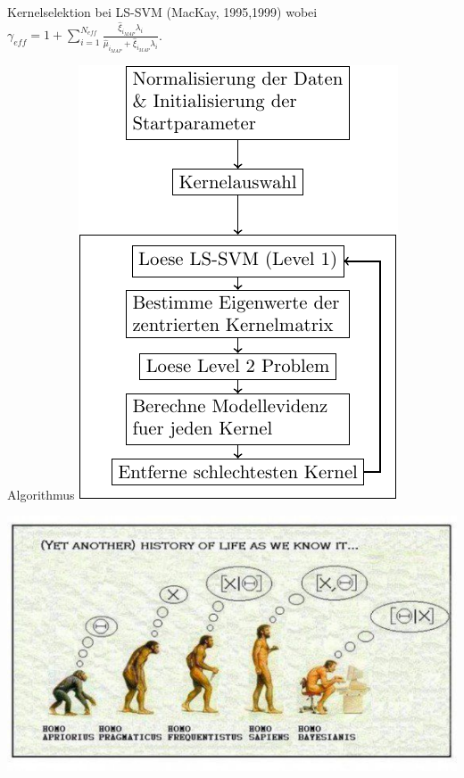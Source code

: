 \documentclass{beamer}
\begin{document}
{\begin{frame}
\begin{block}{Kernelselektion bei LS-SVM (MacKay, 1995,1999)}
wobei $\gamma_{eff} = 1 + \sum_{i=1}^{N_{eff}}\frac{\hat{\xi}_{i_{MAP}}\lambda_i}{\hat{\mu}_{i_{MAP}} + \hat{\xi}_{i_{MAP}}\lambda_i}$.

\end{block}

\end{frame}






\begin{frame}{Algorithmus}
	\centering\includegraphics[scale=0.9]{Algo.pdf}
\end{frame}

\begin{frame}
	\centering\includegraphics[scale=0.7]{humanshistory.pdf}
\end{frame}


}
\end{document}
